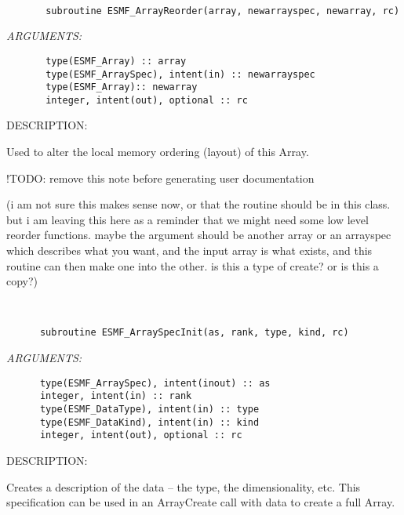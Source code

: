 \mbox{}\hrulefill\ 
 

\begin{verbatim}       subroutine ESMF_ArrayReorder(array, newarrayspec, newarray, rc)\end{verbatim}{\em ARGUMENTS:}
\begin{verbatim}       type(ESMF_Array) :: array
       type(ESMF_ArraySpec), intent(in) :: newarrayspec
       type(ESMF_Array):: newarray
       integer, intent(out), optional :: rc\end{verbatim}
{\sf DESCRIPTION:\\ }


   Used to alter the local memory ordering (layout) of this Array.
  
   !TODO: remove this note before generating user documentation
  
   (i am not sure this makes sense now, or that the routine should be
   in this class. but i am leaving this here as a reminder that we
   might need some low level reorder functions. maybe the argument
   should be another array or an arrayspec which describes what you
   want, and the input array is what exists, and this routine can then
   make one into the other. is this a type of create? or is this
   a copy?)
   
 
\mbox{}\hrulefill\ 
 

\begin{verbatim}      subroutine ESMF_ArraySpecInit(as, rank, type, kind, rc)\end{verbatim}{\em ARGUMENTS:}
\begin{verbatim}      type(ESMF_ArraySpec), intent(inout) :: as
      integer, intent(in) :: rank
      type(ESMF_DataType), intent(in) :: type
      type(ESMF_DataKind), intent(in) :: kind
      integer, intent(out), optional :: rc\end{verbatim}
{\sf DESCRIPTION:\\ }


   Creates a description of the data -- the type, the dimensionality, etc.
   This specification can be
   used in an ArrayCreate call with data to create a full Array.
  
